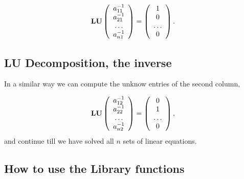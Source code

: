 \documentclass[%
twoside,                 %
final,                   %
10pt]{article}
\begin{document}
{{{{\[
    {\bf LU}\left( \begin{array}{c}

                              a_{11}^{-1} \\
                              a_{21}^{-1} \\
                              \dots \\
                              a_{n1}^{-1} \\
                    \end{array} \right) =\left( \begin{array}{c}
                               1 \\
                              0 \\
                              \dots \\
                              0 \\
                    \end{array} \right).
\]

\subsection{LU Decomposition, the inverse}

In a similar way we can compute the unknow entries of the second column,

\[
    {\bf LU}\left( \begin{array}{c}

                              a_{12}^{-1} \\
                              a_{22}^{-1} \\
                              \dots \\
                              a_{n2}^{-1} \\
                    \end{array} \right) =\left( \begin{array}{c}
                                0 \\
                              1 \\
                              \dots \\
                              0 \\
                    \end{array} \right),
\]
and continue till we have solved all $n$ sets of linear equations.

\subsection{How to use the Library functions}

}}}}
\end{document}

